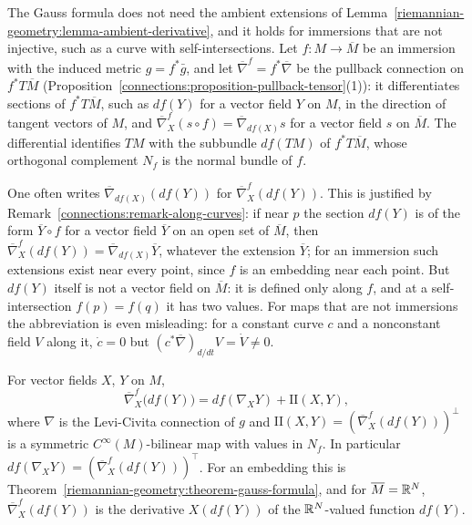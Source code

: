 The Gauss formula does not need the ambient extensions of Lemma~\ref{riemannian-geometry:lemma-ambient-derivative}, and it holds for immersions that are not injective, such
as a curve with self-intersections. Let $f \colon M \to \overline{M}$ be an immersion with the induced metric $g = f^*\bar g$, and let $\overline{\nabla}^f = f^*\overline{\nabla}$ be the
pullback connection on $f^*T\overline{M}$ (Proposition~\ref{connections:proposition-pullback-tensor}(1)): it differentiates sections of $f^*T\overline{M}$, such as $df(Y)$ for a
vector field $Y$ on $M$, in the direction of tangent vectors of $M$, and $\overline{\nabla}^f_X(s \circ f) = \overline{\nabla}_{df(X)}s$ for a vector field $s$ on $\overline{M}$.
The differential identifies $TM$ with the subbundle $df(TM)$ of $f^*T\overline{M}$, whose orthogonal complement $N_f$ is the normal bundle of $f$.

One often writes $\overline{\nabla}_{df(X)}(df(Y))$ for $\overline{\nabla}^f_X(df(Y))$. This is justified by
Remark~\ref{connections:remark-along-curves}: if near $p$ the section $df(Y)$ is of the form $\overline{Y} \circ f$ for a vector field $\overline{Y}$ on an open set of
$\overline{M}$, then $\overline{\nabla}^f_X(df(Y)) = \overline{\nabla}_{df(X)}\overline{Y}$, whatever the extension $\overline{Y}$; for an immersion such extensions exist near
every point, since $f$ is an embedding near each point. But $df(Y)$ itself is not a vector field on $\overline{M}$: it is defined only along $f$, and at a self-intersection
$f(p) = f(q)$ it has two values. For maps that are not immersions the abbreviation is even misleading: for a constant curve $c$ and a nonconstant field $V$ along it,
$\dot c = 0$ but $(c^*\overline{\nabla})_{d/dt}V = \dot V \neq 0$.

\begin{proposition}\label{riemannian-geometry:proposition-gauss-immersion}
For vector fields $X$, $Y$ on $M$,
\[
\overline{\nabla}^f_X\bigl(df(Y)\bigr) = df(\nabla_XY) + \mathrm{II}(X, Y),
\]
where $\nabla$ is the Levi-Civita connection of $g$ and $\mathrm{II}(X, Y) = (\overline{\nabla}^f_X(df(Y)))^\perp$ is a symmetric $C^\infty(M)$-bilinear map with values in $N_f$.
In particular $df(\nabla_XY) = (\overline{\nabla}^f_X(df(Y)))^\top$. For an embedding this is Theorem~\ref{riemannian-geometry:theorem-gauss-formula}, and for
$\overline{M} = \mathbb{R}^N$, $\overline{\nabla}^f_X(df(Y))$ is the derivative $X(df(Y))$ of the $\mathbb{R}^N$-valued function $df(Y)$.
\end{proposition}

